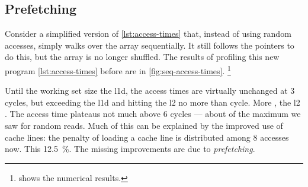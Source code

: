 \subsection{Prefetching}
\label{sec:prefetch}

Consider a simplified version of \cref{lst:access-times} that, instead of using random
accesses, simply walks over the array sequentially.  It still follows the pointers to do
this, but the array is no longer shuffled.  The results of profiling this new program
 \cref{lst:access-times} before are
 in \cref{fig:seq-access-times}.%
\footnote{%
    shows the numerical results.%
}

%
%
%
%

Until the working set size  the \gls{l1d}, the access times
are virtually unchanged at 3 cycles, but exceeding the \gls{l1d} and hitting the \gls{l2}
 no more than  cycle.
More ,  the \gls{l2}
.
The access time plateaus not much above 6 cycles  --- about  of the maximum we saw for random reads.
Much of this can be explained by the improved use of cache lines: the penalty of loading a
cache line is distributed among 8 accesses now.  This 
\SI{12.5}{\percent}.
The missing improvements are due to \emph{prefetching}.

